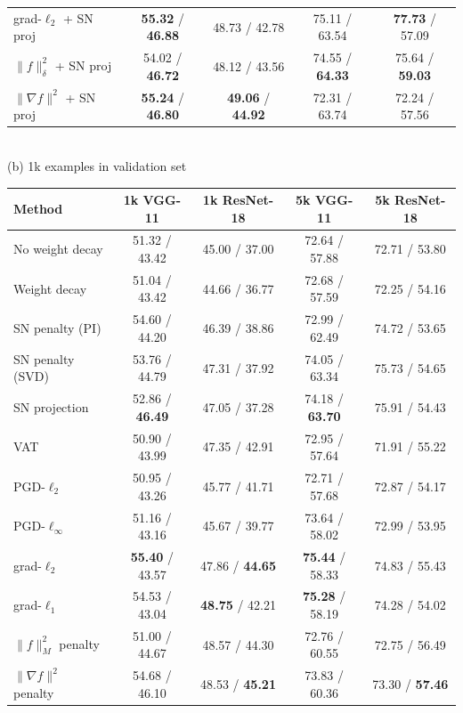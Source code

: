 \begin{table}[h]
\begin{tabular}{ | l | c | c | c | c |  }
grad-$\ell_2$ + SN proj & \textbf{55.32} / \textbf{46.88} & 48.73 / 42.78 & 75.11 / 63.54 & \textbf{77.73} / 57.09 \\
$\|f\|_\delta^2$ + SN proj & 54.02 / \textbf{\color{darkgray}46.72} & 48.12 / 43.56 & 74.55 / \textbf{\color{darkgray}64.33} & 75.64 / \textbf{59.03} \\
$\|\nabla f\|^2$ + SN proj & \textbf{55.24} / \textbf{46.80} & \textbf{\color{darkgray}49.06} / \textbf{44.92} & 72.31 / 63.74 & 72.24 / 57.56 \\
\hline
\end{tabular}
\\
\vspace{0.2cm}
(b) 1k examples in validation set

\begin{tabular}{ | l | c | c | c | c |  }
\hline
Method & 1k VGG-11 & 1k ResNet-18 & 5k VGG-11 & 5k ResNet-18 \\ \hline
\hline
No weight decay & 51.32 / 43.42 & 45.00 / 37.00 & 72.64 / 57.88 & 72.71 / 53.80 \\
Weight decay & 51.04 / 43.42 & 44.66 / 36.77 & 72.68 / 57.59 & 72.25 / 54.16 \\
SN penalty (PI) & 54.60 / 44.20 & 46.39 / 38.86 & 72.99 / 62.49 & 74.72 / 53.65 \\
SN penalty (SVD) & 53.76 / 44.79 & 47.31 / 37.92 & 74.05 / 63.34 & 75.73 / 54.65 \\
SN projection & 52.86 / \textbf{\color{darkgray}46.49} & 47.05 / 37.28 & 74.18 / \textbf{\color{darkgray}63.70} & 75.91 / 54.43 \\
VAT & 50.90 / 43.99 & 47.35 / 42.91 & 72.95 / 57.64 & 71.91 / 55.22 \\
PGD-$\ell_2$ & 50.95 / 43.26 & 45.77 / 41.71 & 72.71 / 57.68 & 72.87 / 54.17 \\
PGD-$\ell_\infty$ & 51.16 / 43.16 & 45.67 / 39.77 & 73.64 / 58.02 & 72.99 / 53.95 \\
grad-$\ell_2$ & \textbf{55.40} / 43.57 & 47.86 / \textbf{\color{darkgray}44.65} & \textbf{75.44} / 58.33 & 74.83 / 55.43 \\
grad-$\ell_1$ & 54.53 / 43.04 & \textbf{\color{darkgray}48.75} / 42.21 & \textbf{\color{darkgray}75.28} / 58.19 & 74.28 / 54.02 \\
\hline
$\|f\|_M^2$ penalty & 51.00 / 44.67 & 48.57 / 44.30 & 72.76 / 60.55 & 72.75 / 56.49 \\
$\|\nabla f\|^2$ penalty & 54.68 / 46.10 & 48.53 / \textbf{45.21} & 73.83 / 60.36 & 73.30 / \textbf{\color{darkgray}57.46} \\

\end{tabular}
\end{table}
